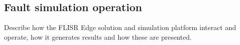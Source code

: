 \subsection{Fault simulation operation}
\label{sec:operation}

Describe how the FLISR Edge solution and simulation platform interact and operate, how it generates results and how these are presented.

